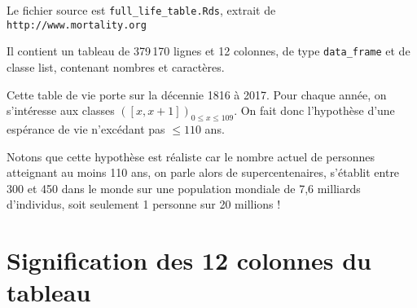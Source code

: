 \documentclass{article}
\def\lq{\leqslant}
\def\lq{\leqslant}
\begin{document}
\vspace{1.0cm}


\vspace{1.0cm}


\noindent Le fichier source est {\tt full\_life\_table.Rds}, extrait de {\tt http://www.mortality.org}

\vspace{0.4cm}

\noindent Il contient un tableau de 379\,170 lignes et 12 colonnes, de type {\tt data\_frame} et de classe list, contenant nombres et caractères.

\vspace{0.4cm}

\noindent Cette table de vie porte sur la décennie 1816 à 2017. Pour chaque année, on s'intéresse aux classes $\left([x,x+1]\right)_{0\lq x\lq 109}$. On fait donc l'hypothèse d'une espérance de vie n'excédant pas $\lq 110$ ans.

\vspace{0.4cm}

\noindent Notons que cette hypothèse est réaliste car le nombre actuel de personnes atteignant au moins 110 ans, on parle alors de supercentenaires, s'établit entre 300 et 450 dans le monde sur une population mondiale de 7,6 milliards d'individus, soit seulement 1 personne sur 20 millions !

\setcounter{section}{2}

\section{Signification des 12 colonnes du tableau}
\end{document}
